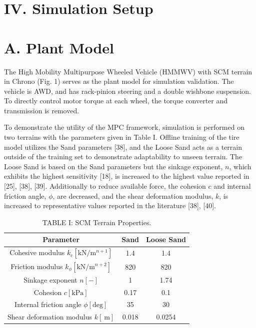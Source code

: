 \documentclass[10pt]{article}
\begin{document}
\section*{IV. Simulation Setup}
\section*{A. Plant Model}
The High Mobility Multipurpose Wheeled Vehicle (HMMWV) with SCM terrain in Chrono (Fig. 1) serves as the plant model for simulation validation. The vehicle is AWD, and has rack-pinion steering and a double wishbone suspension. To directly control motor torque at each wheel, the torque converter and transmission is removed.

To demonstrate the utility of the MPC framework, simulation is performed on two terrains with the parameters given in Table I. Offline training of the tire model utilizes the Sand parameters [38], and the Loose Sand acts as a terrain outside of the training set to demonstrate adaptability to unseen terrain. The Loose Sand is based on the Sand parameters but the sinkage exponent, $n$, which exhibits the highest sensitivity [18], is increased to the highest value reported in [25], [38], [39]. Additionally to reduce available force, the cohesion $c$ and internal friction angle, $\phi$, are decreased, and the shear deformation modulus, $k$, is increased to representative values reported in the literature [38], [40].

\begin{table}[h]
\begin{center}
\begin{tabular}{c|c|c}
\hline
Parameter & Sand & Loose Sand \\
\hline
Cohesive modulus $k_{c}\left[\mathrm{kN} / \mathrm{m}^{n+1}\right]$ & 1.4 & 1.4 \\
Friction modulus $k_{\phi}\left[\mathrm{kN} / \mathrm{m}^{n+2}\right]$ & 820 & 820 \\
Sinkage exponent $n[-]$ & 1 & 1.74 \\
Cohesion $c[\mathrm{kPa}]$ & 0.17 & 0.1 \\
Internal friction angle $\phi[\mathrm{deg}]$ & 35 & 30 \\
Shear deformation modulus $k[\mathrm{~m}]$ & 0.018 & 0.0254 \\
\hline
\end{tabular}
\captionsetup{labelformat=empty}
\caption{TABLE I: SCM Terrain Properties.}
\end{center}
\end{table}
\end{document}

